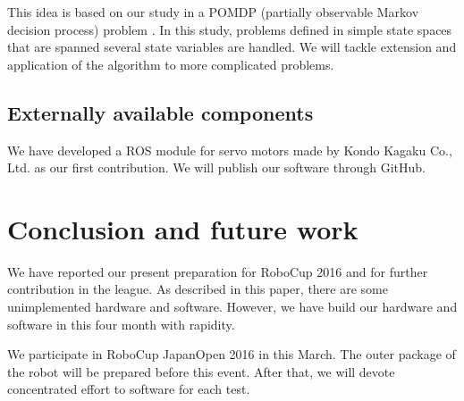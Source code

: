 \documentclass{llncs}
\begin{document}
This idea is based on our study in a POMDP
(partially observable Markov decision process) problem
\cite{ueda2015}. In this study, problems defined in
simple state spaces that are spanned several state variables
are handled. We will tackle extension and application of
the algorithm to more complicated problems.


\subsection{Externally available components}

We have developed a ROS module for servo motors made
by Kondo Kagaku Co., Ltd.
as our first contribution\cite{hayashibara_kondo}.
We will publish our software through GitHub.

\section{Conclusion and future work}\label{sec:conclusion}

We have reported our present preparation for
RoboCup 2016 and for further contribution in the league.
As described in this paper, there are some unimplemented
hardware and software. However, we have build our hardware
and software in this four month with rapidity.

We participate in RoboCup JapanOpen 2016 in this March.
The outer package of the robot will be prepared before
this event. After that, we will devote concentrated effort
to software for each test.

%
%
\end{document}
